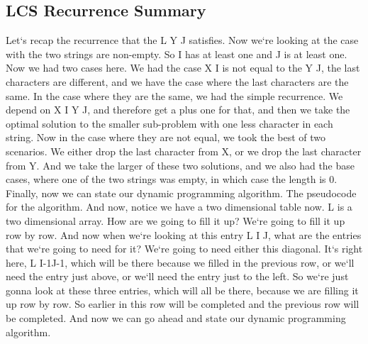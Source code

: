 \subsection{LCS  Recurrence Summary}
Let`s recap the recurrence that the L Y J satisfies.
Now we`re looking at the case with the two strings are non-empty.
So I has at least one and J is at least one.
Now we had two cases here.
We had the case X I is not equal to the Y J, the last characters are different, and we have the case where the last characters are the same.
In the case where they are the same, we had the simple recurrence.
We depend on X I Y J, and therefore get a plus one for that, and then we take the optimal solution to the smaller sub-problem with one less character in each string.
Now in the case where they are not equal, we took the best of two scenarios.
We either drop the last character from X, or we drop the last character from Y\@.
And we take the larger of these two solutions, and we also had the base cases, where one of the two strings was empty, in which case the length is 0.
Finally, now we can state our dynamic programming algorithm.
The pseudocode for the algorithm.
And now, notice we have a two dimensional table now.
L is a two dimensional array.
How are we going to fill it up? We`re going to fill it up row by row.
And now when we`re looking at this entry L I J, what are the entries that we`re going to need for it? We`re going to need either this diagonal.
It`s right here, L I-1J-1, which will be there because we filled in the previous row, or we`ll need the entry just above, or we`ll need the entry just to the left.
So we`re just gonna look at these three entries, which will all be there, because we are filling it up row by row.
So earlier in this row will be completed and the previous row will be completed.
And now we can go ahead and state our dynamic programming algorithm.

